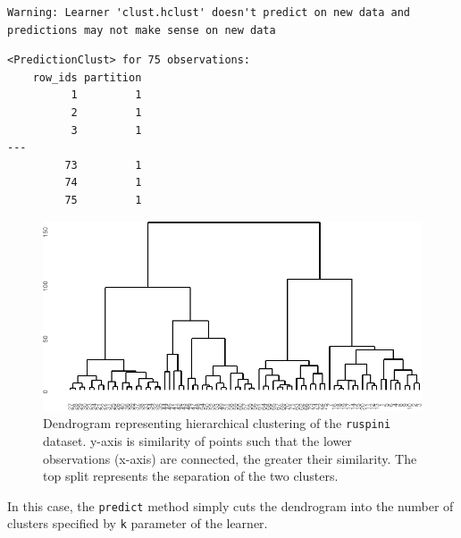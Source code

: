 \begin{verbatim}
Warning: Learner 'clust.hclust' doesn't predict on new data and
predictions may not make sense on new data
\end{verbatim}

\begin{verbatim}
<PredictionClust> for 75 observations:
    row_ids partition
          1         1
          2         1
          3         1
---                  
         73         1
         74         1
         75         1
\end{verbatim}

\begin{Shaded}
\begin{Highlighting}[]
\SpecialCharTok{+} \NormalTok{(} \NormalTok{(} \NormalTok{))}
\end{Highlighting}
\end{Shaded}

\begin{figure}[H]

{\centering \includegraphics[width=1\textwidth,height=\textheight]{chapters/chapter13/beyond_regression_and_classification_files/figure-pdf/fig-beyond-clust-dend-1.pdf}

}

\caption{\label{fig-beyond-clust-dend}Dendrogram representing
hierarchical clustering of the \texttt{ruspini} dataset. y-axis is
similarity of points such that the lower observations (x-axis) are
connected, the greater their similarity. The top split represents the
separation of the two clusters.}

\end{figure}

In this case, the \texttt{predict} method simply cuts the dendrogram
into the number of clusters specified by \texttt{k} parameter of the
learner.


